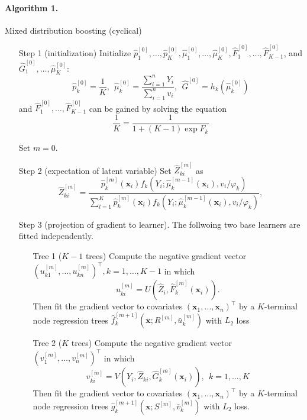 \documentclass[11pt]{article}
\numberwithin{equation}{section}
\def\bx{\boldsymbol{x}}
\begin{document}
\paragraph{Algorithm 1.} Mixed distribution boosting (cyclical)
\begin{itemize}
	\item[Step 1] (initialization)  Initialize $\hat{p}_1^{[0]}, \ldots, \hat{p}_K^{[0]}, \hat{\mu}_1^{[0]},\ldots,\hat{\mu}_K^{[0]}, \hat{F}_1^{[0]}, \ldots, \hat{F}_{K-1}^{[0]}$, and $\hat{G}_1^{[0]},\ldots,\hat{\mu}_K^{[0]}$:
	$$\hat{p}_k^{[0]}=\frac{1}{K},~~ \hat{\mu}_k^{[0]}=\frac{\sum_{i=1}^nY_i}{\sum_{i=1}^n v_i},~~
	\hat{G}^{[0]}=h_k(\hat{\mu}_k^{[0]})$$ and $\hat{F}_1^{[0]}, \ldots, \hat{F}_{K-1}^{[0]}$ can be gained by solving the equation
	$$ \frac{1}{K} = \frac{1}{1+(K-1)\exp{F}_k}$$ 
	
	Set $m=0$.
	
	\item[Step 2] (expectation of latent variable) 
	Set $\hat{Z}_{ki}^{[m]}$ as 
	\begin{equation*}
		\hat{Z}_{ki}^{[m]}=\frac{\hat{p}_{k}^{[m]}(\bx_i) f_{k}\left(Y_i ; \hat{\mu}_{k}^{[m-1]}(\bx_i), v_i / \varphi_{k}\right)}{\sum_{l=1}^{K} \hat{p}_{k}^{[m]}(\bx_i) f_{k}\left(Y_i ; \hat{\mu}_{k}^{[m-1]}(\bx_i), v_i / \varphi_{k}\right)},
	\end{equation*}
	
	\item[Step 3] (projection of gradient to learner). The follwoing two base learners  are fitted independently. 
	\begin{itemize}
		\item[Tree 1]($K-1$ trees)  Compute the negative gradient vector $(u_{k1}^{[m]},\ldots,u_{kn}^{[m]})^\top, k=1,\ldots,K-1$ in which 
		$$u_{ki}^{[m]}=U(\hat{Z}_i,\hat{F}_k^{[m]}(\bx_i)).$$
		Then fit the gradient vector to covariates $(\bx_1,\ldots,\bx_n)^\top$ by a $K$-terminal node regression trees $\hat{f}_k^{[m+1]}\left(\bx;R^{[m]},\bar{u}_k^{[m]}\right)$ with $L_2$ loss 
		
		\item[Tree 2]($K$ trees) Compute the negative gradient vector $(v_1^{[m]},\ldots,v_n^{[m]})^\top$ in which 
		$$v_{ki}^{[m]}=V(Y_i,\hat{Z}_{ki},\hat{G}_k^{[m]}(\bx_i)),~~k=1,\ldots,K$$
		Then fit the gradient vector to covariates $(\bx_1,\ldots,\bx_n)^\top$ by a $K$-terminal node regression trees $\hat{g}_k^{[m+1]}\left(\bx;S^{[m]},\bar{v}_k^{[m]}\right)$ with $L_2$ loss.
		

\end{itemize}
\end{itemize}
\end{document}
